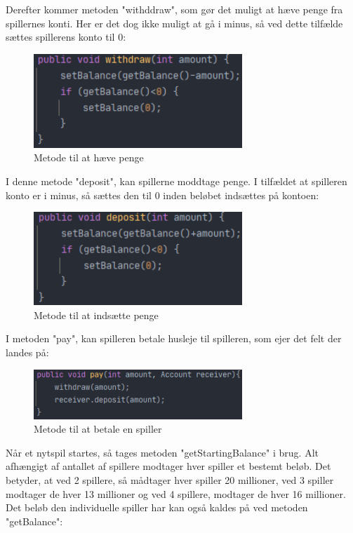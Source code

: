 Derefter kommer metoden "withddraw", som gør det muligt at hæve penge fra spillernes konti. Her er det dog ikke muligt at gå i minus, så ved dette tilfælde sættes spillerens konto til 0:
\begin{figure}[H]
    \centering
    \includegraphics[width=0.7\textwidth]{sources/7_implementering/withdraw.PNG}
    \caption{Metode til at hæve penge}
    \label{fig:chance}
\end{figure}
I denne metode "deposit", kan spillerne moddtage penge. I tilfældet at spilleren konto er i minus, så sættes den til 0 inden beløbet indsættes på kontoen:
\begin{figure}[H]
    \centering
    \includegraphics[width=0.7\textwidth]{sources/7_implementering/deposit.PNG}
    \caption{Metode til at indsætte penge}
    \label{fig:chance}
\end{figure}
I metoden "pay", kan spilleren betale husleje til spilleren, som ejer det felt der landes på:
\begin{figure}[H]
    \centering
    \includegraphics[width=0.7\textwidth]{sources/7_implementering/pay.PNG}
    \caption{Metode til at betale en spiller}
    \label{fig:chance}
\end{figure}
Når et nytspil startes, så tages metoden "getStartingBalance" i brug. Alt afhængigt af antallet af spillere modtager hver spiller et bestemt beløb. Det betyder, at ved 2 spillere, så mådtager hver spiller 20 millioner, ved 3 spiller modtager de hver 13 millioner og ved 4 spillere, modtager de hver 16 millioner. Det beløb den individuelle spiller har kan også kaldes på ved metoden "getBalance":
